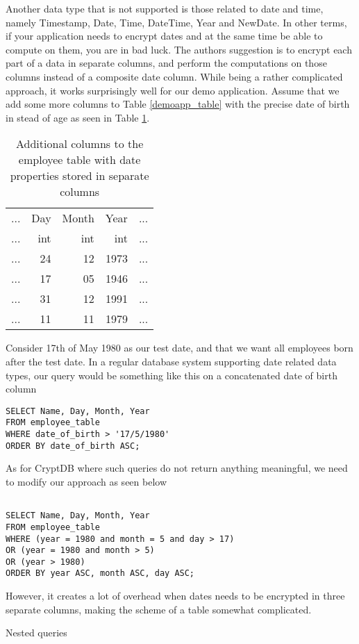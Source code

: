 Another data type that is not supported is those related to date and time, namely Timestamp, Date, Time, DateTime, Year and NewDate. In other terms, if your application needs to encrypt dates and at the same time be able to compute on them, you are in bad luck. The authors suggestion is to encrypt each part of a data in separate columns, and perform the computations on those columns instead of a composite date column. While being a rather complicated approach, it works surprisingly well for our demo application. Assume that we add some more columns to Table \ref{demoapp_table} with the precise date of birth in stead of age as seen in Table \ref{tab:empl_tab_mod}.

\begin{table}[H]
\centering
\begin{tabular}{| c | r | r | r | c |}
\hline
  ... & Day & Month & Year & ... \\
  ... & int & int & int & ... \\
 \hline \hline
 ... & 24 & 12 & 1973  & ... \\
 ... & 17 & 05 & 1946 & ... \\
 ... & 31 & 12 & 1991 & ... \\
 ... & 11 & 11 & 1979  & ... \\
 \hline
\end{tabular}
\caption{Additional columns to the employee table with date properties stored in separate columns}
\label{tab:empl_tab_mod}
\end{table}

Consider 17th of May 1980 as our test date, and that we want all employees born after the test date. In a regular database system supporting date related data types, our query would be something like this on a concatenated date of birth column

\begin{verbatim}
SELECT Name, Day, Month, Year
FROM employee_table
WHERE date_of_birth > '17/5/1980'
ORDER BY date_of_birth ASC;
\end{verbatim}

As for CryptDB where such queries do not return anything meaningful, we need to modify our approach as seen below

\begin{verbatim}

SELECT Name, Day, Month, Year
FROM employee_table
WHERE (year = 1980 and month = 5 and day > 17)
OR (year = 1980 and month > 5)
OR (year > 1980)
ORDER BY year ASC, month ASC, day ASC;

\end{verbatim}


However, it creates a lot of overhead when dates needs to be encrypted in three separate columns, making the scheme of a table somewhat complicated. 


Nested queries
